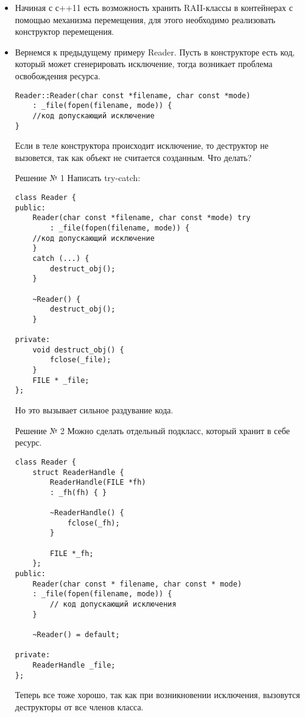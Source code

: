 \begin{itemize}
\item
Начиная с с++11 есть возможность хранить RAII-классы в контейнерах с помощью механизма перемещения, для этого необходимо реализовать конструктор перемещения.
\item
Вернемся к предыдущему примеру Reader.
Пусть в конструкторе есть код, который может сгенерировать исключение, тогда возникает проблема освобождения ресурса.

\begin{verbatim}
Reader::Reader(char const *filename, char const *mode)
    : _file(fopen(filename, mode)) {
    //код допускающий исключение
}
\end{verbatim}
Если в теле конструктора происходит исключение, то деструктор не вызовется, так как объект не считается созданным. Что делать?

Решение № 1
Написать try-catch:
\begin{verbatim}
class Reader {
public:
    Reader(char const *filename, char const *mode) try
        : _file(fopen(filename, mode)) {
    //код допускающий исключение
    }
    catch (...) {
        destruct_obj();
    }

    ~Reader() {
        destruct_obj();
    }

private:
    void destruct_obj() {
        fclose(_file);
    }
    FILE * _file;
};
\end{verbatim}
Но это вызывает сильное раздувание кода.

Решение № 2
Можно сделать отдельный подкласс, который хранит в себе ресурс.
\begin{verbatim}
class Reader {
    struct ReaderHandle {
        ReaderHandle(FILE *fh)
        : _fh(fh) { }

        ~ReaderHandle() {
            fclose(_fh);
        }

        FILE *_fh;
    };
public:
    Reader(char const * filename, char const * mode)
    : _file(fopen(filename, mode)) {
        // код допускающий исключения
    }

    ~Reader() = default;

private:
    ReaderHandle _file;
};
\end{verbatim}
Теперь все тоже хорошо, так как при возникновении исключения, вызовутся деструкторы от все членов класса.


\end{itemize}
